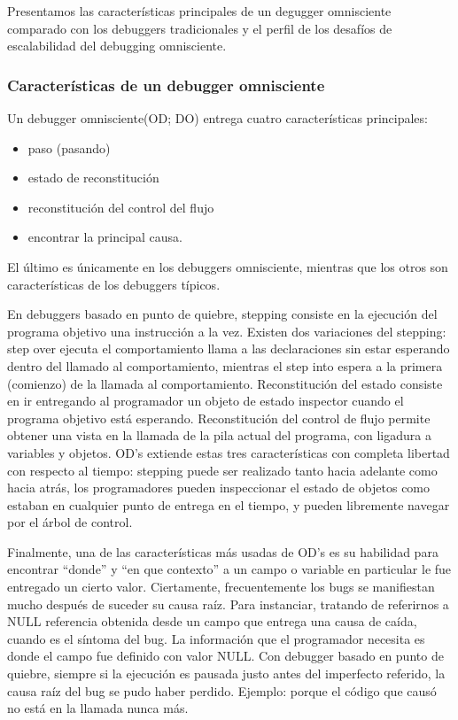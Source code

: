 \documentclass[12pt,legalpaper]{report}
\begin{document}
	Presentamos las características principales de un degugger omnisciente comparado con los debuggers tradicionales y el perfil de los desafíos de escalabilidad del debugging omnisciente.

			\subsubsection[Características]{Características de un debugger omnisciente}

	Un debugger omnisciente(OD; DO) entrega cuatro características principales:
\begin{itemize}
	\item paso (pasando)
	\item estado de reconstitución
	\item reconstitución del control del flujo
	\item encontrar la principal causa.  
\end{itemize}
El último es únicamente en los debuggers omnisciente, mientras que los otros son características de los debuggers típicos.

	En debuggers basado en punto de quiebre, stepping consiste en la ejecución del programa objetivo una instrucción a la vez.  Existen dos variaciones del stepping:  step over ejecuta el comportamiento llama a las declaraciones sin estar esperando dentro del llamado al comportamiento, mientras el step into espera a la primera (comienzo) de la llamada al comportamiento.  Reconstitución del estado consiste en ir entregando al programador un objeto de estado inspector cuando el programa objetivo está esperando.  Reconstitución del control de flujo permite obtener una vista en la llamada de la pila actual del programa, con ligadura a variables y objetos.  OD's extiende estas tres características con completa libertad con respecto al tiempo:  stepping puede ser realizado tanto hacia adelante como hacia atrás, los programadores pueden inspeccionar el estado de objetos como estaban en cualquier punto de entrega en el tiempo, y pueden libremente navegar por el árbol de control.

	Finalmente, una de las características más usadas de OD's es su habilidad para encontrar “donde” y “en que contexto” a un campo o variable en particular le fue entregado un cierto valor.  Ciertamente, frecuentemente los bugs se manifiestan mucho después de suceder su causa raíz.  Para instanciar, tratando de referirnos a NULL referencia obtenida desde un campo que entrega una causa de caída, cuando es el síntoma del bug.  La información que el programador necesita es donde el campo fue definido con valor NULL.  Con debugger basado en punto de quiebre, siempre si la ejecución es pausada justo antes del imperfecto referido, la causa raíz del bug se pudo haber perdido.  Ejemplo:  porque el código que causó no está en la llamada nunca más.
\end{document}

